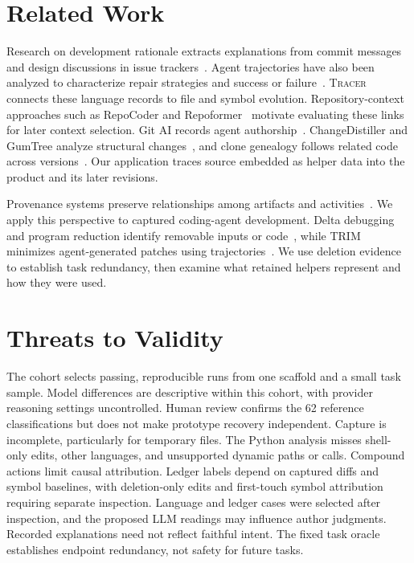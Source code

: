 \documentclass[10pt,conference]{IEEEtran}
\newcommand{\tracer}{\textsc{Tracer}}
\begin{document}
\section{Related Work}
Research on development rationale extracts explanations from commit messages~\cite{rationale} and design discussions in issue trackers~\cite{drminer}. Agent trajectories have also been analyzed to characterize repair strategies and success or failure~\cite{agentbehaviour}. \tracer{} connects these language records to file and symbol evolution. Repository-context approaches such as RepoCoder and Repoformer~\cite{repocoder,repoformer} motivate evaluating these links for later context selection. Git AI records agent authorship~\cite{gitai}. ChangeDistiller and GumTree analyze structural changes~\cite{changedistiller,gumtree,gumtree2024}, and clone genealogy follows related code across versions~\cite{genealogy,aigenealogy}. Our application traces source embedded as helper data into the product and its later revisions.

Provenance systems preserve relationships among artifacts and activities~\cite{prov,noworkflow,yesworkflow,reprozip}. We apply this perspective to captured coding-agent development. Delta debugging and program reduction identify removable inputs or code~\cite{dd,perses,chisel}, while TRIM minimizes agent-generated patches using trajectories~\cite{trim}. We use deletion evidence to establish task redundancy, then examine what retained helpers represent and how they were used.

\section{Threats to Validity}
The cohort selects passing, reproducible runs from one scaffold and a small task sample. Model differences are descriptive within this cohort, with provider reasoning settings uncontrolled. Human review confirms the 62 reference classifications but does not make prototype recovery independent. Capture is incomplete, particularly for temporary files. The Python analysis misses shell-only edits, other languages, and unsupported dynamic paths or calls. Compound actions limit causal attribution. Ledger labels depend on captured diffs and symbol baselines, with deletion-only edits and first-touch symbol attribution requiring separate inspection. Language and ledger cases were selected after inspection, and the proposed LLM readings may influence author judgments. Recorded explanations need not reflect faithful intent. The fixed task oracle establishes endpoint redundancy, not safety for future tasks.
\end{document}
